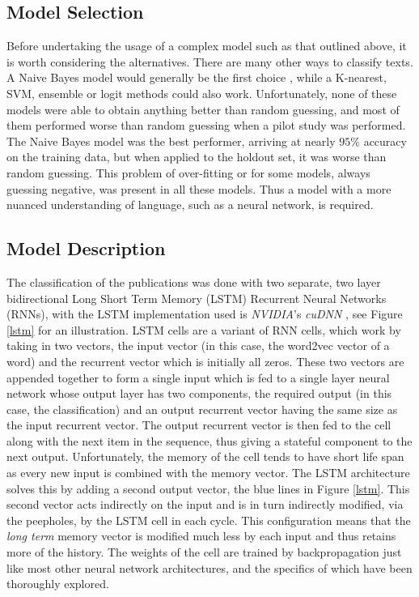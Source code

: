 \documentclass[12pt, a4paper]{article}
\begin{document}
 \subsection{Model Selection}\label{ness}
 
Before undertaking the usage of a complex model such as that outlined above, it is worth considering the alternatives. There are many other ways to classify texts. A Naive Bayes model would generally be the first choice \citep{mccallum1998comparison}, while a K-nearest, SVM, ensemble or logit methods could also work. Unfortunately, none of these models were able to obtain anything better than random guessing, and most of them performed worse than random guessing when a pilot study was performed. The Naive Bayes model was the best performer, arriving at nearly $95\%$ accuracy on the training data, but when applied to the holdout set, it was worse than random guessing. This problem of over-fitting or for some models, always guessing negative, was present in all these models. Thus a model with a more nuanced understanding of language, such as a neural network, is required.
  
 \subsection{Model Description}

The classification of the publications was done with two separate, two layer bidirectional \citep{graves2013hybrid} Long Short Term Memory (LSTM) \citep{Hochreiter:1997:LSM:1246443.1246450} Recurrent Neural Networks (RNNs), with the LSTM implementation used is \textit{NVIDIA}'s \textit{cuDNN} \citep{chetlur2014cudnn}, see Figure \ref{lstm} for an illustration. LSTM cells are a variant of RNN cells, which work by taking in two vectors, the input vector (in this case, the word2vec vector of a word) and the recurrent vector which is initially all zeros. These two vectors are appended together to form a single input which is fed to a single layer neural network whose output layer has two components, the required output (in this case, the classification) and an output recurrent vector having the same size as the input recurrent vector. The output recurrent vector is then fed to the cell along with the next item in the sequence, thus giving a stateful component to the next output. Unfortunately, the memory of the cell tends to have short life span \citep{greff2017lstm} as every new input is combined with the memory vector. The LSTM architecture solves this by adding a second output vector, the blue lines in Figure \ref{lstm}. This second vector acts indirectly on the input and is in turn indirectly modified, via the peepholes, by the LSTM cell in each cycle. This configuration means that the \textit{long term} memory vector is modified much less by each input and thus retains more of the history. The weights of the cell are trained by backpropagation\citep{pytorch} just like most other neural network architectures, and the specifics of which have been thoroughly explored\citep{riedmiller1993direct}.
\end{document}
